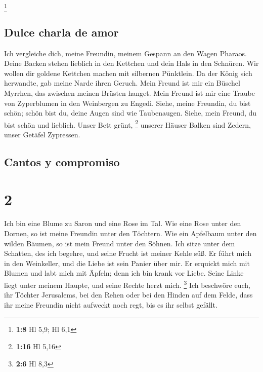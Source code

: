 \footnote{\textbf{1:8} Hl 5,9; Hl 6,1}

\hypertarget{dulce-charla-de-amor}{%
\subsection{Dulce charla de amor}\label{dulce-charla-de-amor}}

 Ich vergleiche dich, meine Freundin, meinem Gespann an
den Wagen Pharaos.  Deine Backen stehen lieblich in den
Kettchen und dein Hals in den Schnüren.  Wir wollen dir
goldene Kettchen machen mit silbernen Pünktlein.  Da der
König sich herwandte, gab meine Narde ihren Geruch.  Mein
Freund ist mir ein Büschel Myrrhen, das zwischen meinen Brüsten hanget.
 Mein Freund ist mir eine Traube von Zyperblumen in den
Weinbergen zu Engedi.  Siehe, meine Freundin, du bist
schön; schön bist du, deine Augen sind wie Taubenaugen. 
Siehe, mein Freund, du bist schön und lieblich. Unser Bett grünt,
\footnote{\textbf{1:16} Hl 5,16}  unserer Häuser Balken
sind Zedern, unser Getäfel Zypressen.

\hypertarget{cantos-y-compromiso}{%
\subsection{Cantos y compromiso}\label{cantos-y-compromiso}}

\hypertarget{section-1}{%
\section{2}\label{section-1}}

 Ich bin eine Blume zu Saron und eine Rose im Tal.
 Wie eine Rose unter den Dornen, so ist meine Freundin
unter den Töchtern.  Wie ein Apfelbaum unter den wilden
Bäumen, so ist mein Freund unter den Söhnen. Ich sitze unter dem
Schatten, des ich begehre, und seine Frucht ist meiner Kehle süß.
 Er führt mich in den Weinkeller, und die Liebe ist sein
Panier über mir.  Er erquickt mich mit Blumen und labt
mich mit Äpfeln; denn ich bin krank vor Liebe.  Seine
Linke liegt unter meinem Haupte, und seine Rechte herzt mich.
\footnote{\textbf{2:6} Hl 8,3}  Ich beschwöre euch, ihr
Töchter Jerusalems, bei den Rehen oder bei den Hinden auf dem Felde,
dass ihr meine Freundin nicht aufweckt noch regt, bis es ihr selbst
gefällt.

